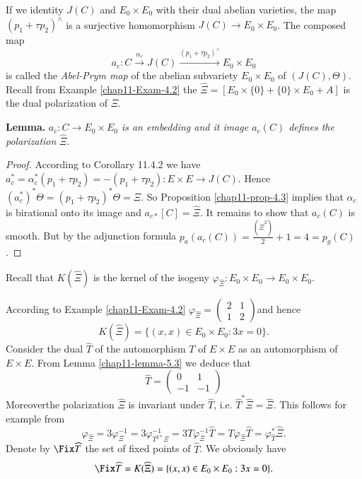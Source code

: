 If we identity $J(C)$ and $E_{0}\times E_{0}$ with their dual abelian varieties, the map $(p_{1} + \tau p_{2})^{\wedge}$ is a surjective homomorphism $J(C) \rightarrow E_{0}\times E_{0}$. The composed map
$$
a_{c}: C\xrightarrow{\alpha_{c}} J(C)\xrightarrow{(p_{1}+ \tau p_{2})^{\wedge}}E_{0} \times E_{0}
$$
is called the \textit{Abel-Prym map} of the abelian subvariety $E_{0}\times E_{0}$ of $(J(C), \Theta)$. Recall from Example \ref{chap11-Exam-4.2} the $\widehat{\Xi} = [E_{0}\times \{0\} + \{0\} \times E_{0} + A]$ is the dual polarization of $\Xi$.

\medskip
\noindent
{\bfseries {} Lemma.\label{chap11-lemma-5.5}} \textit{$a_{c}: C\rightarrow E_{0}\times E_{0}$ is an embedding and it image $a_{c}(C)$ defines the polarization} $\widehat{\Xi}$.

\begin{proof}
According to \cite{chap11-keyL-B} Corollary 11.4.2 we have $a_{c}^{*} =\alpha_{c}^{*}(p_{1} + \tau p_{2})=-(p_{1} + \tau p_{2}): E\times E \rightarrow J(C)$. Hence $(a_{c}^{*})^{*}\Theta = (p_{1} + \tau p_{2})^{*}\Theta = \Xi$. So Proposition \ref{chap11-prop-4.3} implies that $\alpha_{c}$ is birational onto its image and $a_{c*}[C]=\widehat{\Xi}$. It remains to show that $a_{c}(C)$ is smooth. But by the adjunction formula $p_{a}(a_{c}(C)) =\frac{(\widehat{\Xi}^{2})}{2} + 1 =4 = p_{g}(C)$.
\end{proof}

Recall that $K (\widehat{\Xi})$ is the kernel of the isogeny $\varphi_{\widehat{\Xi}}: E_{0} \times E_{0} \rightarrow E_{0} \times E_{0}$.

According to Example \ref{chap11-Exam-4.2}
$\varphi_{\widehat{\Xi}}= \begin{pmatrix}
2 & 1\\
1 & 2
\end{pmatrix}
$and hence
$$
K(\widehat{\Xi}) = \{(x,x) \in E_{0} \times E_{0}: 3x =0\}.
$$
Consider the dual $\widehat{T}$ of the automorphism $T$ of $E \times E$ as an automorphism
of  $ E\times E$. From Lemma \ref{chap11-lemma-5.3} we deduce that
$$
\widehat{T}=\begin{pmatrix}
0 & 1\\
-1 & -1
\end{pmatrix}
$$
\newpage
\noindent
Moreover\pageoriginale the polarization $\widehat{\Xi}$ is invariant under $\widehat{T}$, i.e. $\widehat{T}^{*}\widehat{\Xi} = \widehat{\Xi}$. This follows for example from
$$
\varphi_{\widehat{\Xi}} =3 \varphi_{\Xi}^{-1} = 3\varphi_{T^{2*}\Xi}^{-1} = 3 T\varphi_{\Xi}^{-1}\widehat{T}= T \varphi_{\widehat{\Xi}}\widehat{T} = \varphi_{\widehat{T}}^{*} \widehat{\Xi}.
$$
Denote by $\Fix\widehat{T}$ the set of fixed points of $\widehat{T}$. We obviously have
$$
\Fix\widehat{T}=K(\widehat{\Xi}) = \{(x,x) \in E_{0} \times E_{0}: 3x =0\}.
$$ 

